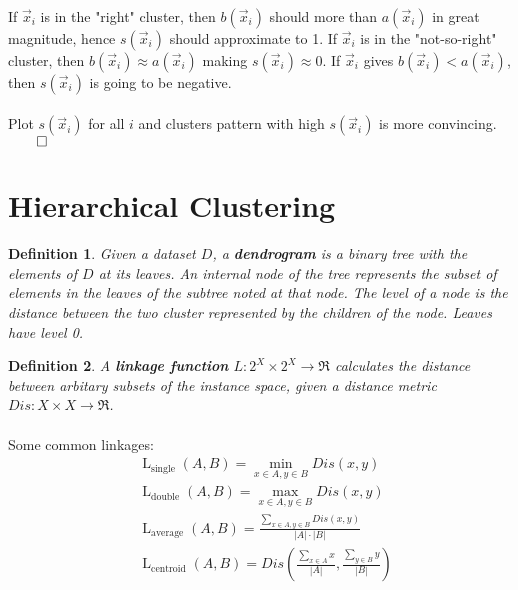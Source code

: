 \documentclass{article}
\newtheorem{definition}{Definition}
\begin{document}
\paragraph{}
If $\Vec{x}_i$ is in the "right" cluster, then $b(\Vec{x}_i)$ should more than $a(\Vec{x}_i)$ in great magnitude, hence $s(\Vec{x}_i)$ should approximate to 1. If $\Vec{x}_i$ is in the "not-so-right" cluster, then $b(\Vec{x}_i)\approx a(\Vec{x}_i)$ making $s(\Vec{x}_i) \approx 0$. If $\Vec{x}_i$ gives $b(\Vec{x}_i) < a(\Vec{x}_i)$, then $s(\Vec{x}_i)$ is going to be negative.

\paragraph{}
Plot $s(\Vec{x}_i)$ for all $i$ and clusters pattern with high $s(\Vec{x}_i)$ is more convincing. $\qed$

\section{Hierarchical Clustering}
\begin{definition}
Given a dataset $D$, a \textbf{dendrogram} is a binary tree with the elements of $D$ at its leaves. An internal node of the tree represents the subset of elements in the leaves of the subtree noted at that node. The level of a node is the distance between the two cluster represented by the children of the node. Leaves have level 0.
\end{definition}
\begin{definition}
A \textbf{linkage function} $L: 2^X \times 2^X \rightarrow \Re$ calculates the distance between arbitary subsets of the instance space, given a distance metric $Dis: X \times X \rightarrow \Re$.
\end{definition}

\paragraph{}
Some common linkages:
\begin{align*}
    &\operatorname{L}_{\text{single}} (A, B) = \operatorname*{min}_{x \in A, y \in B} Dis (x, y) \\
    &\operatorname{L}_{\text{double}} (A, B) = \operatorname*{max}_{x \in A, y \in B} Dis (x, y) \\
    &\operatorname{L}_{\text{average}} (A, B) = \frac{\displaystyle\sum_{x\in A, y\in B}Dis (x, y)}{|A|\cdot|B|}\\
    &\operatorname{L}_{\text{centroid}} (A, B) = 
    Dis(\frac{\displaystyle\sum_{x\in A}x}{|A|},\frac{\displaystyle\sum_{y\in B}y}{|B|})
\end{align*}
\end{document}
